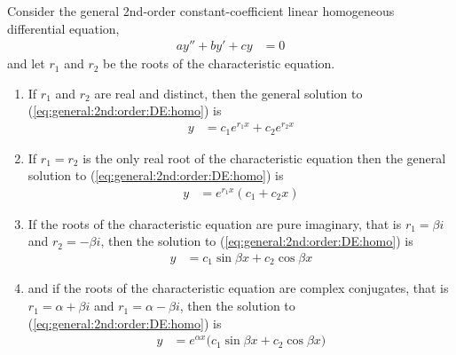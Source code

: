 \begin{lemma} \label{lem:soln:2nd:order:DE:homo}
Consider the general 2nd-order constant-coefficient linear homogeneous differential equation,
%
\begin{align} \label{eq:general:2nd:order:DE:homo}
a y'' + b y' + c y & = 0
\end{align}
and let $r_1$ and $r_2$ be the roots of the characteristic equation.
\begin{enumerate}
\item If $r_1$ and $r_2$ are real and distinct, then the general solution to (\ref{eq:general:2nd:order:DE:homo}) is
%
\begin{align} \label{eq:soln:2nd:order:DE:homo:eq1}
y & = c_1 e^{r_1 x} + c_2 e^{r_2 x}
\end{align}
\item If $r_1=r_2$ is the only real root of the characteristic equation then the general solution to (\ref{eq:general:2nd:order:DE:homo}) is
%
\begin{align} \label{eq:soln:2nd:order:DE:homo:eq2}
y & = e^{r_1 x} (c_1 + c_2 x )
\end{align}
\item If the roots of the characteristic equation are pure imaginary, that is $r_1=\beta i$ and $r_2=-\beta i$, then the solution to (\ref{eq:general:2nd:order:DE:homo}) is
%
\begin{align} \label{eq:soln:2nd:order:DE:homo:eq3}
y & = c_1 \sin \beta x + c_2 \cos \beta x
\end{align}
\item and if the roots of the characteristic equation are complex conjugates, that is $r_1=\alpha + \beta i $ and $r_1=\alpha - \beta i $, then the solution to (\ref{eq:general:2nd:order:DE:homo}) is
%
\begin{align} \label{eq:soln:2nd:order:DE:homo:eq4}
y & = e^{\alpha x} \bigl( c_1 \sin \beta x + c_2 \cos \beta x)
\end{align}
\end{enumerate}
\end{lemma}

